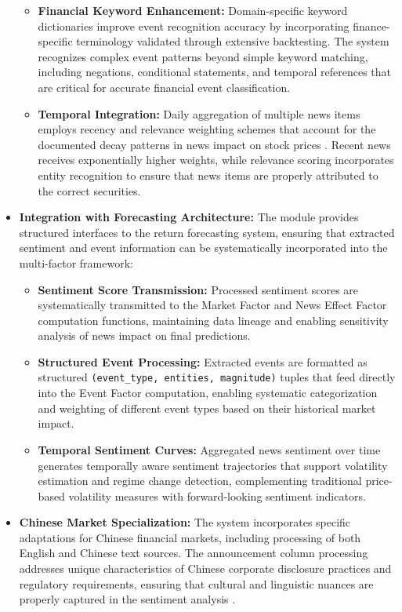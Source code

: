 \documentclass[3p,times,procedia]{elsarticle}
\begin{document}
\begin{itemize}
\begin{itemize}
\item \textbf{Financial Keyword Enhancement:} Domain-specific keyword dictionaries improve event recognition accuracy by incorporating finance-specific terminology validated through extensive backtesting. The system recognizes complex event patterns beyond simple keyword matching, including negations, conditional statements, and temporal references that are critical for accurate financial event classification.

\item \textbf{Temporal Integration:} Daily aggregation of multiple news items employs recency and relevance weighting schemes that account for the documented decay patterns in news impact on stock prices \cite{TETLOCK2007}. Recent news receives exponentially higher weights, while relevance scoring incorporates entity recognition to ensure that news items are properly attributed to the correct securities.
\end{itemize}

\item \textbf{Integration with Forecasting Architecture:} The module provides structured interfaces to the return forecasting system, ensuring that extracted sentiment and event information can be systematically incorporated into the multi-factor framework:

\begin{itemize}
\item \textbf{Sentiment Score Transmission:} Processed sentiment scores are systematically transmitted to the Market Factor and News Effect Factor computation functions, maintaining data lineage and enabling sensitivity analysis of news impact on final predictions.

\item \textbf{Structured Event Processing:} Extracted events are formatted as structured \texttt{(event\_type, entities, magnitude)} tuples that feed directly into the Event Factor computation, enabling systematic categorization and weighting of different event types based on their historical market impact.

\item \textbf{Temporal Sentiment Curves:} Aggregated news sentiment over time generates temporally aware sentiment trajectories that support volatility estimation and regime change detection, complementing traditional price-based volatility measures with forward-looking sentiment indicators.
\end{itemize}

\item \textbf{Chinese Market Specialization:} The system incorporates specific adaptations for Chinese financial markets, including processing of both English and Chinese text sources. The announcement column processing addresses unique characteristics of Chinese corporate disclosure practices and regulatory requirements, ensuring that cultural and linguistic nuances are properly captured in the sentiment analysis \cite{FinReportDataset2025}.
\end{itemize}
\end{document}
